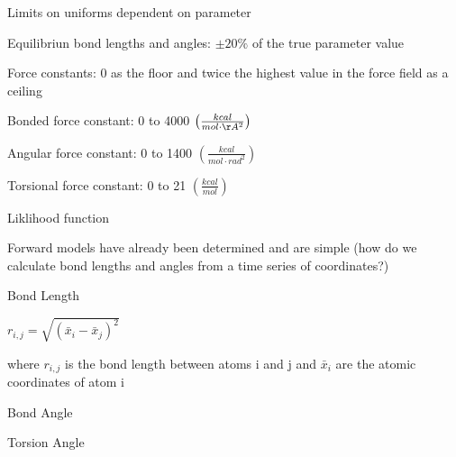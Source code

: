 \documentclass{report}
\begin{document}
\begin{outline}
\begin{outline}
\begin{outline}
\begin{outline}
        \item{Limits on uniforms dependent on parameter}
        \begin{outline}
          \item{Equilibriun bond lengths and angles: $\pm 20\%$ of the true parameter value}
          \item{Force constants: 0 as the floor and twice the highest value in the force field as a ceiling}
          \begin{outline}
            \item{Bonded force constant: 0 to 4000 $\left(\frac{kcal}{mol \cdot \AA^2}\right)$}
            \item{Angular force constant: 0 to 1400 $\left(\frac{kcal}{mol \cdot rad^2}\right)$}
            \item{Torsional force constant: 0 to 21 $\left(\frac{kcal}{mol}\right)$}
          \end{outline}
        \end{outline}
      \end{outline}
      \item{Liklihood function}
      \begin{outline} 
        \item{Forward models have already been determined and are simple (how do we calculate bond lengths and angles from a time series of coordinates?)}
        \begin{outline}
          \item{Bond Length}
          \begin{outline}
            \item{$r_{i,j} = \sqrt{\left(\bar{x}_i - \bar{x}_j\right)^2}$}
            \item{where $r_{i,j}$ is the bond length between atoms i and j and $\bar{x}_i$ are the atomic coordinates of atom i}
          \end{outline}
          \item{Bond Angle}
          \begin{outline}
            \item{$\dot{x}_{i,j,k} = \left(\bar{x}_i - \bar{x}_j\right) \cdot \left(\bar{x}_j - \bar{x}_k\right)$
            \item{$\theta_{i,j,k} = \arccos \frac{\dot{x}_{i,j,k}}{r_{i,j} \cdot r_{j,k}}$}
            \item{where $\theta_{i,j,k}$ is the angle between bonded atoms i,j and k}
          \end{outline}
          \item{Torsion Angle}

\end{outline}
\end{outline}
\end{outline}
\end{outline}
\end{outline}
\end{document}
